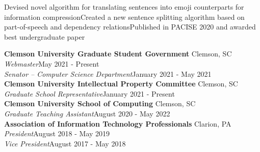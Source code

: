 \documentclass[letter]{article}
\begin{document}

            {Devised novel algorithm for translating sentences into emoji counterparts for information compression}{Created a new sentence splitting algorithm based on part-of-speech and dependency relations}{Published in PACISE 2020 and awarded best undergraduate paper}


            \textbf{Clemson University Graduate Student Government} \hfill Clemson, SC\\
            \textit{Webmaster}\hfill{}May 2021 - Present\\
            \textit{Senator -- Computer Science Department}\hfill{}January 2021 - May 2021\\
    \vspace{\interspace}
            \textbf{Clemson University Intellectual Property Committee} \hfill Clemson, SC\\
        \textit{Graduate School Representative}\hfill{}January 2021 - Present\\
    \vspace{\interspace}
            \textbf{Clemson University School of Computing} \hfill Clemson, SC\\
        \textit{Graduate Teaching Assistant}\hfill{}August 2020 - May 2022\\
    \vspace{\interspace}
            \textbf{Association of Information Technology Professionals} \hfill Clarion, PA\\
            \textit{President}\hfill{}August 2018 - May 2019\\
            \textit{Vice President}\hfill{}August 2017 - May 2018\\
    \vspace{\interspace}
    \vspace{-\interspace}



\end{document}
